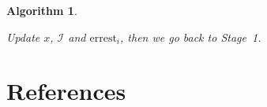 \documentclass[review]{elsarticle}
\newtheorem{algo}{Algorithm}
\begin{document}
\begin{algo}
\begin{description}
    Update $x$, $\mathcal{I}$ and $\text{errest}_i$, then we go back to Stage~1.

\end{description}
\end{algo}

\section*{References}


\end{document}
